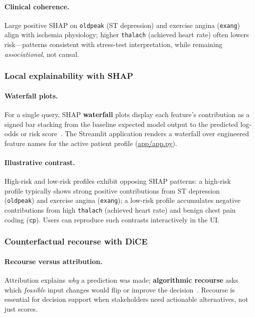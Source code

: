\documentclass[11pt,a4paper]{article}
\begin{document}
\paragraph{Clinical coherence.}
Large positive SHAP on \texttt{oldpeak} (ST depression) and exercise angina (\texttt{exang}) align with ischemia physiology; higher \texttt{thalach} (achieved heart rate) often lowers risk—patterns consistent with stress-test interpretation, while remaining \emph{associational}, not causal.

\subsubsection{Local explainability with SHAP}
\label{sec:shap_local}

\paragraph{Waterfall plots.}
For a single query, SHAP \textbf{waterfall} plots display each feature's contribution as a signed bar stacking from the baseline expected model output to the predicted log-odds or risk score~\cite{lundberg}. The Streamlit application renders a waterfall over engineered feature names for the active patient profile (\url{app/app.py}).

\paragraph{Illustrative contrast.}
High-risk and low-risk profiles exhibit opposing SHAP patterns: a high-risk profile typically shows strong positive contributions from ST depression (\texttt{oldpeak}) and exercise angina (\texttt{exang}); a low-risk profile accumulates negative contributions from high \texttt{thalach} (achieved heart rate) and benign chest pain coding (\texttt{cp}). Users can reproduce such contrasts interactively in the UI.

\subsubsection{Counterfactual recourse with DiCE}
\label{sec:dice_method}

\paragraph{Recourse versus attribution.}
Attribution explains \emph{why} a prediction was made; \textbf{algorithmic recourse} asks which \emph{feasible} input changes would flip or improve the decision~\cite{dice}. Recourse is essential for decision support when stakeholders need actionable alternatives, not just scores.
\end{document}
